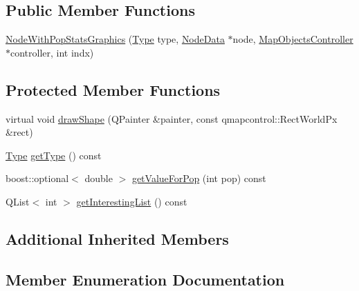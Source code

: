 \subsection*{Public Member Functions}
\begin{DoxyCompactItemize}
\item 
\mbox{\hyperlink{class_node_with_pop_stats_graphics_a01e967f1fa7f5df57cd3c4ed509fe4df}{Node\+With\+Pop\+Stats\+Graphics}} (\mbox{\hyperlink{class_node_with_pop_stats_graphics_aeaa9e3e8bdb1f52ee13c0516413d33fe}{Type}} type, \mbox{\hyperlink{class_node_data}{Node\+Data}} $\ast$node, \mbox{\hyperlink{class_map_objects_controller}{Map\+Objects\+Controller}} $\ast$controller, int indx)
\end{DoxyCompactItemize}
\subsection*{Protected Member Functions}
\begin{DoxyCompactItemize}
\item 
virtual void \mbox{\hyperlink{class_node_with_pop_stats_graphics_aa492c90c2a9d8b3b9d741431d8701a86}{draw\+Shape}} (Q\+Painter \&painter, const qmapcontrol\+::\+Rect\+World\+Px \&rect)
\item 
\mbox{\hyperlink{class_node_with_pop_stats_graphics_aeaa9e3e8bdb1f52ee13c0516413d33fe}{Type}} \mbox{\hyperlink{class_node_with_pop_stats_graphics_a6e60d5d7a442456d4cd9ec5888384543}{get\+Type}} () const
\item 
boost\+::optional$<$ double $>$ \mbox{\hyperlink{class_node_with_pop_stats_graphics_abb61e050e94ad3627b359e0f71ddfefd}{get\+Value\+For\+Pop}} (int pop) const
\item 
Q\+List$<$ int $>$ \mbox{\hyperlink{class_node_with_pop_stats_graphics_ab3143ecda45d6e2e05022c25b0129611}{get\+Interesting\+List}} () const
\end{DoxyCompactItemize}
\subsection*{Additional Inherited Members}


\subsection{Member Enumeration Documentation}
\mbox{\label{class_node_with_pop_stats_graphics_aeaa9e3e8bdb1f52ee13c0516413d33fe}} 
